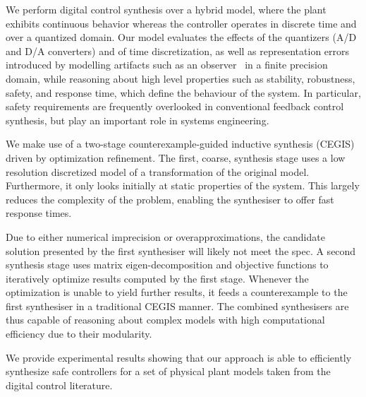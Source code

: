 \documentclass[sigconf]{llncs}
\begin{document}
We perform digital control synthesis over a hybrid model, where the plant
exhibits continuous behavior whereas the controller operates in discrete
time and over a quantized domain.  Our model evaluates the effects of the
quantizers (A/D and D/A converters) and of time discretization, as well as
representation errors introduced by modelling artifacts such as an
observer~\cite{astrom1997computer} in a finite precision domain, while
reasoning about high level properties such as stability, robustness, safety,
and response time, which define the behaviour of the system.  In particular,
safety requirements are frequently overlooked in conventional feedback
control synthesis, but play an important role in systems engineering.


We make use of a two-stage counterexample-guided inductive
synthesis (CEGIS) driven by optimization refinement.
The first, coarse, synthesis stage uses a low resolution discretized model of a 
transformation of the original model. Furthermore, it only looks initially at
static properties  of the system. This largely reduces the complexity of
the problem, enabling the synthesiser to offer fast response times.

Due to either numerical imprecision or overapproximations, the
candidate solution presented by the first synthesiser will likely not
meet the spec. A second synthesis stage uses matrix eigen-decomposition 
and objective functions to iteratively optimize results computed by the first
stage.  Whenever the optimization is unable to yield further results, it feeds
a counterexample to the first synthesiser in a traditional CEGIS manner.
The combined synthesisers are thus capable of reasoning about complex
models with high computational efficiency due to their modularity.

We provide experimental results showing that our approach is able to
efficiently synthesize safe controllers for a set of physical
plant models taken from the digital control literature.
\end{document}
